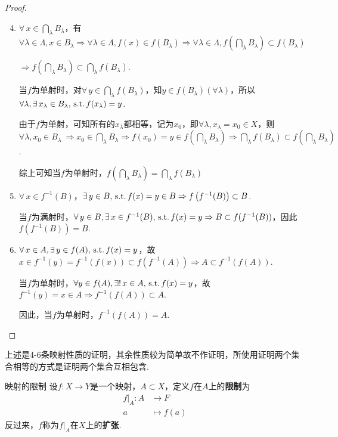 \begin{proof}
    \begin{enumerate}
        \setcounter{enumi}{3}
        \item $\forall\, x\in \bigcap_{\lambda}{B_\lambda}$，有$\forall \lambda\in\Lambda,x\in B_{\lambda} \Rightarrow \forall \lambda\in\Lambda,f(x)\in f \left(B_\lambda\right) \Rightarrow \forall\lambda\in\Lambda,f\left(\bigcap_{\lambda}{B_\lambda}\right)\subset f(B_\lambda)$\par
        $ \Rightarrow f\left(\bigcap_{\lambda}{B_\lambda}\right)\subset\bigcap_{\lambda}{f(B_\lambda)}$.\par
        当$f$为单射时，对$\forall\, y\in \bigcap_{\lambda}{f(B_\lambda)}$，知$y\in f(B_\lambda)(\forall \lambda)$，所以$\forall \lambda,\exists\, x_\lambda\in B_\lambda,\operatorname{\,\text{s.t.}} f(x_\lambda)=y$.\par
        由于$f$为单射，可知所有的$x_\lambda$都相等，记为$x_0$，即$\forall \lambda,x_\lambda=x_0 \in X$，则$\forall \lambda,x_0\in B_\lambda\ \Rightarrow x_0\in\bigcap_{\lambda}{B_\lambda} \Rightarrow f(x_0)=y\in f\left(\bigcap_\lambda{B_\lambda}\right) \Rightarrow \bigcap_{\lambda}{f(B_\lambda)}\subset f\left(\bigcap_\lambda{B_\lambda}\right)$.\par
        综上可知当$f$为单射时，$f\left(\bigcap_{\lambda}{B_\lambda}\right) = \bigcap_{\lambda}{f(B_\lambda)}$
        \item $\forall\, x\in f^{-1}(B)$，$\exists\, y\in B,\operatorname{\,\text{s.t.}} f(x)=y\in B \Rightarrow f\left(f^{-1}(B)\right)\subset B$.\par
        当$f$为满射时，$\forall\, y\in B,\exists\, x\in f^{-1}(B),\operatorname{\,\text{s.t.}} f(x)=y \Rightarrow B \subset f(f^{-1}(B))$，因此$f\left(f^{-1}(B)\right)= B$.
        \item $\forall\, x\in A,\exists\, y\in f(A),\operatorname{\,\text{s.t.}} f(x)=y$，故$x\in f^{-1}(y) = f^{-1}(f(x)) \subset f(f^{-1}(A)) \Rightarrow A\subset f^{-1}(f(A))$.\par
        当$f$为单射时，$\forall y\in f(A),\exists!\, x\in A,\operatorname{\,\text{s.t.}} f(x)=y$，故$f^{-1}(y)=x\in A \Rightarrow f^{-1}(f(A))\subset A$.\par
        因此，当$f$为单射时，$f^{-1}(f(A))=A$.
    \end{enumerate}
\end{proof}

上述是4-6条映射性质的证明，其余性质较为简单故不作证明，所使用证明两个集合相等的方式是证明两个集合互相包含.


\begin{definition}{映射的限制}
    设$f:X\to Y$是一个映射，$A\subset X$，定义$f$在$A$上的\textbf{限制}为
    \begin{align*}
        f|_A :A &\to F \\
        a &\mapsto f(a)
    \end{align*}
    反过来，$f$称为$f|_A$在$X$上的\textbf{扩张}.
\end{definition}


